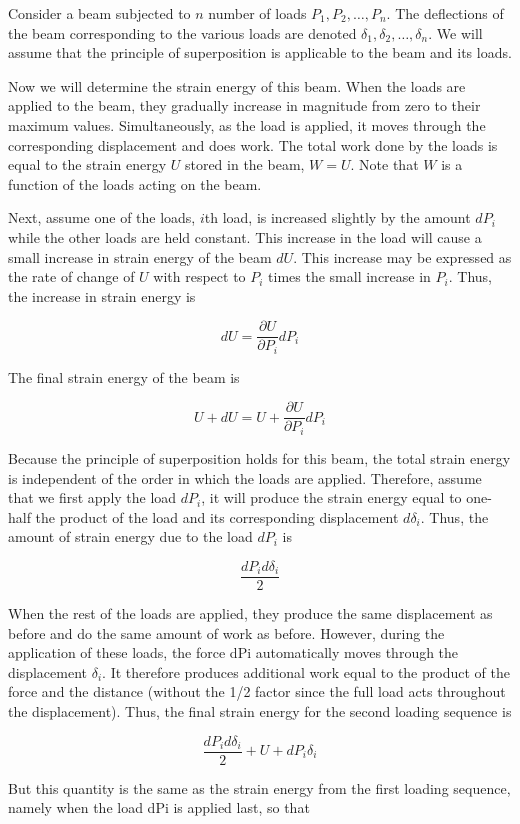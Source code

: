 \documentclass[
fontsize=10pt,
a4paper,
twosides=false,
open=any,
svgnames,
]{kaobook} %
\begin{document}
Consider a beam subjected to $n$ number of loads $P_1, P_2, \ldots, P_n$. The deflections of the beam corresponding to the various loads are denoted $\delta_1, \delta_2, \ldots, \delta_n$. We will assume that the principle of superposition is applicable to the beam and its loads.

Now we will determine the strain energy of this beam. When the loads are applied to the beam, they gradually increase in magnitude from zero to their maximum values. Simultaneously, as the load is applied, it moves through the corresponding displacement and does work. The total work done by the loads is equal to the strain energy $U$ stored in the beam, $W = U$. Note that $W$ is a function of the loads acting on the beam.

Next, assume one of the loads, $i$th load, is increased slightly by the amount $dP_i$ while the other loads are held constant. This increase in the load will cause a small increase in strain energy of the beam $dU$. This increase may be expressed as the rate of change of $U$ with respect to $P_i$ times the small increase in $P_i$. Thus, the increase in strain energy is

\[dU = \frac{\partial U}{\partial P_i} dP_i\]

The final strain energy of the beam is

\[U + dU = U + \frac{\partial U}{\partial P_i} dP_i\]

Because the principle of superposition holds for this beam, the total strain energy is independent of the order in which the loads are applied. Therefore, assume that we first apply the load $dP_i$, it will produce the strain energy equal to one-half the product of the load and its corresponding displacement $d\delta_i$. Thus, the amount of strain energy due to the load $dP_i$ is

\[\frac{dP_i d\delta _i}{2}\]

When the rest of the loads are applied, they produce the same displacement as before and do the same amount of work as before. However, during the application of these loads, the force dPi automatically moves through the displacement $\delta_i$. It therefore produces additional work equal to the product of the force and the distance (without the 1/2 factor since the full load acts throughout the displacement). Thus, the final strain energy for the second loading sequence is

\[\frac{dP_i d\delta _i}{2} + U + dP_i\delta _i\]

But this quantity is the same as the strain energy from the first loading sequence, namely when the load dPi is applied last, so that
\end{document}
